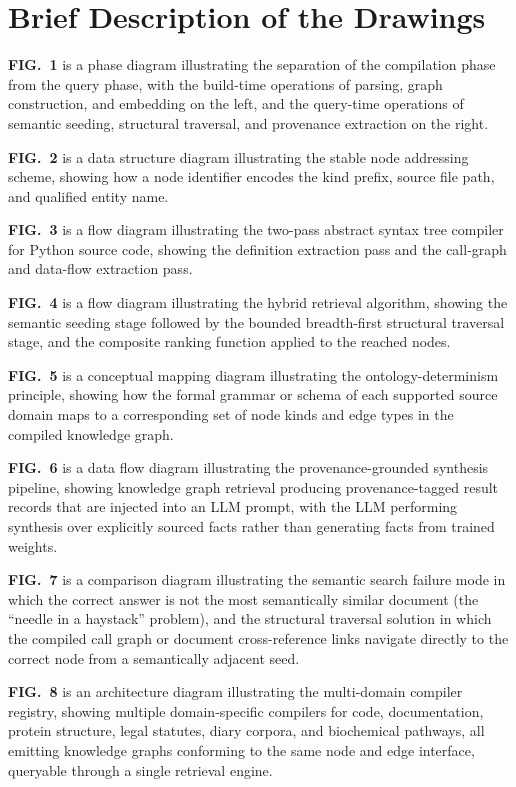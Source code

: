 \documentclass[12pt]{article}
\begin{document}
\section*{Brief Description of the Drawings}

\textbf{FIG.~1} is a phase diagram illustrating the separation of the compilation
phase from the query phase, with the build-time operations of parsing, graph
construction, and embedding on the left, and the query-time operations of
semantic seeding, structural traversal, and provenance extraction on the right.

\textbf{FIG.~2} is a data structure diagram illustrating the stable node
addressing scheme, showing how a node identifier encodes the kind prefix, source
file path, and qualified entity name.

\textbf{FIG.~3} is a flow diagram illustrating the two-pass abstract syntax tree
compiler for Python source code, showing the definition extraction pass and the
call-graph and data-flow extraction pass.

\textbf{FIG.~4} is a flow diagram illustrating the hybrid retrieval algorithm,
showing the semantic seeding stage followed by the bounded breadth-first
structural traversal stage, and the composite ranking function applied to the
reached nodes.

\textbf{FIG.~5} is a conceptual mapping diagram illustrating the
ontology-determinism principle, showing how the formal grammar or schema of each
supported source domain maps to a corresponding set of node kinds and edge types
in the compiled knowledge graph.

\textbf{FIG.~6} is a data flow diagram illustrating the provenance-grounded
synthesis pipeline, showing knowledge graph retrieval producing provenance-tagged
result records that are injected into an LLM prompt, with the LLM performing
synthesis over explicitly sourced facts rather than generating facts from trained
weights.

\textbf{FIG.~7} is a comparison diagram illustrating the semantic search failure
mode in which the correct answer is not the most semantically similar document
(the ``needle in a haystack'' problem), and the structural traversal solution in
which the compiled call graph or document cross-reference links navigate directly
to the correct node from a semantically adjacent seed.

\textbf{FIG.~8} is an architecture diagram illustrating the multi-domain compiler
registry, showing multiple domain-specific compilers for code, documentation,
protein structure, legal statutes, diary corpora, and biochemical pathways, all
emitting knowledge graphs conforming to the same node and edge interface,
queryable through a single retrieval engine.
\end{document}
